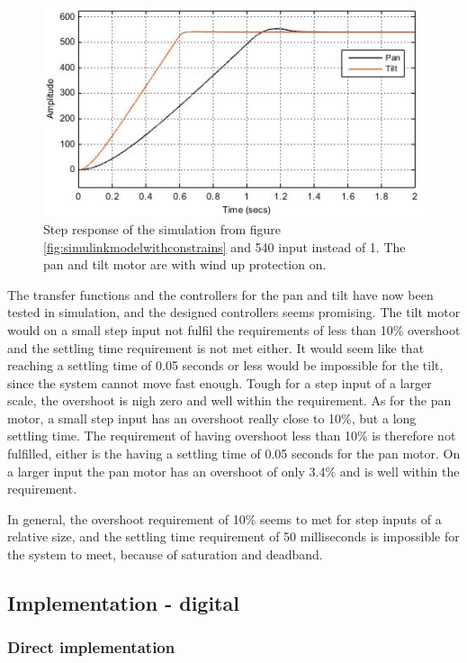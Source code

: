 \begin{figure}[h!]
\centering
\includegraphics[scale=0.7]{Billeder/SimuStepPanAndTiltWithWindUpProtection.jpg}
\caption{   Step response of the simulation from figure \ref{fig:simulinkmodelwithconstrains} and 540 input instead of 1. The pan and tilt motor are with wind up protection on.
 }
\label{fig:SimuStepPanAndTiltWithWindUpProtection}
\end{figure}

The transfer functions and the controllers for the pan and tilt have now been tested in simulation, and the designed controllers seems promising. The tilt motor would on a small step input not fulfil the requirements of less than 10\% overshoot and the settling time requirement is not met either. It would seem like that reaching a settling time of 0.05 seconds or less would be impossible for the tilt, since the system cannot move fast enough. Tough for a step input of a larger scale, the overshoot is nigh zero and well within the requirement.
As for the pan motor, a small step input has an overshoot really close to 10\%, but a long settling time. The requirement of having overshoot less than 10\% is therefore not fulfilled, either is the having a settling time of 0.05 seconds for the pan motor. On a larger input the pan motor has an overshoot of only 3.4\% and is well within the requirement.

In general, the overshoot requirement of 10\% seems to met for step inputs of a relative size, and the settling time requirement of 50 milliseconds is impossible for the system to meet, because of saturation and deadband.

\subsection{Implementation - digital}

\subsubsection{Direct implementation}

